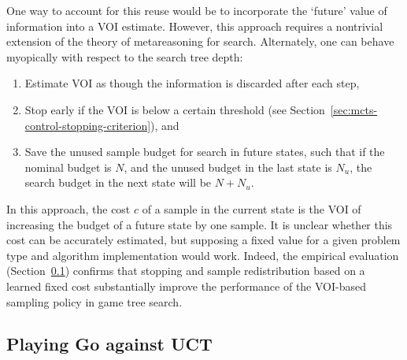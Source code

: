 One way to account for this reuse would be to incorporate the
`future' value of information into a VOI estimate. However, this 
approach requires a nontrivial extension of the theory of metareasoning for search.
Alternately, one can behave myopically with respect to the search tree depth:
\begin{enumerate}
\item Estimate VOI as though the information is discarded after each step,
\item Stop early if the VOI is below a certain threshold
   (see Section~\ref{sec:mcts-control-stopping-criterion}), and
\item Save the unused sample budget for search in future states, such that
   if the nominal budget is $N$, and the unused budget in the last state
   is $N_u$, the search budget in the next state will be $N+N_u$.
\end{enumerate}
In this approach, the cost $c$ of a sample in the current state is the
VOI of increasing the budget of a future state by one sample.  It is
unclear whether this cost can be accurately estimated, but supposing
a fixed value for a given problem type and algorithm implementation
would work. Indeed, the empirical evaluation (Section~\ref{sec:mcts-emp-go})
confirms that stopping and sample redistribution based on a learned
fixed cost  substantially improve the performance of the VOI-based
sampling policy in game tree search.


\subsection{Playing Go against UCT}
\label{sec:mcts-emp-go}

